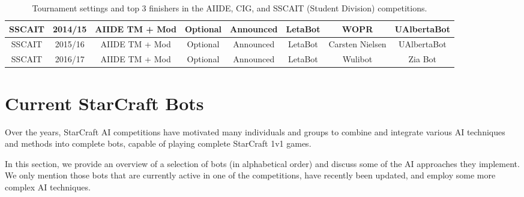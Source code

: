 \begin{table}[t]
\begin{center}
\begin{tabular} {| c | c | c c c | c c c |}
 \hline
 SSCAIT & 2014/15 & AIIDE TM + Mod & Optional & Announced & LetaBot & WOPR & UAlbertaBot\\
 \hline
 SSCAIT & 2015/16 & AIIDE TM + Mod & Optional & Announced & LetaBot & Carsten Nielsen & UAlbertaBot \\
 \hline
 SSCAIT & 2016/17 & AIIDE TM + Mod & Optional & Announced & LetaBot & Wulibot & Zia Bot\\
 \hline
 \end{tabular}
 \end{center}  
 \caption{Tournament settings and top 3 finishers in the AIIDE, CIG, and SSCAIT (Student Division) competitions.}
 \label{tableTournaments}
\end{table} 

\section{Current StarCraft Bots}\label{secBots}

Over the years, StarCraft AI competitions have motivated many individuals and groups to combine and integrate various AI techniques and methods into complete bots, capable of playing complete StarCraft 1v1 games. 

In this section, we provide an overview of a selection of bots (in alphabetical order) and discuss some of the AI approaches they implement. We only mention those bots that are currently active in one of the competitions, have recently been updated, and employ some more complex AI techniques. 

